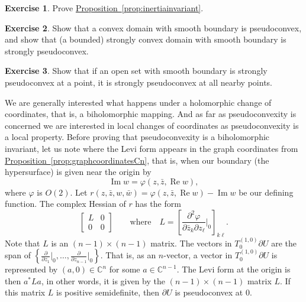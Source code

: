 \documentclass[12pt,openany]{book}
\renewcommand{\Re}{\operatorname{Re}}
\renewcommand{\Im}{\operatorname{Im}}
\newcommand{\C}{{\mathbb{C}}}
\theoremstyle{plain}
\theoremstyle{remark}
\theoremstyle{definition}
\newenvironment{exbox}{%
    \def\FrameCommand{\vrule width 1pt \relax\hspace{10pt}}%
    \MakeFramed{\advance\hsize-\width\FrameRestore}%
}{%
    \endMakeFramed
}
\theoremstyle{exercise}
\newtheorem{exercise}{Exercise}[section]
\theoremstyle{example}
\newcommand{\propref}[1]{\hyperref[#1]{Proposition~\ref*{#1}}}
\begin{document}
\begin{exbox}
\begin{exercise}
Prove \propref{prop:inertiainvariant}.
\end{exercise}

\begin{exercise}
Show that a convex domain with smooth boundary
is pseudoconvex, and show that (a bounded) strongly convex
domain with smooth boundary is strongly pseudoconvex.
\end{exercise}

\begin{exercise}
Show that if an open set with smooth boundary is strongly pseudoconvex at a point, it is strongly
pseudoconvex at all nearby points.
\end{exercise}
\end{exbox}

We are generally interested what happens under a holomorphic change of
coordinates, that is, a biholomorphic mapping.  And as far as pseudoconvexity
is concerned we are interested in local changes of coordinates as
pseudoconvexity is a local property.  Before proving
that pseudoconvexity is a biholomorphic invariant, let us note where the
Levi form appears in the graph coordinates from
\propref{prop:graphcoordinatesCn}, that is, when our boundary (the
hypersurface) is given near the origin by
\begin{equation*}
\Im w = \varphi(z,\bar{z},\Re w) ,
\end{equation*}
where $\varphi$ is $O(2)$.
Let $r(z,\bar{z},w,\bar{w}) = \varphi(z,\bar{z},\Re w) - \Im w$ be our
defining function.  The complex Hessian of $r$ has the form
\begin{equation*}
\begin{bmatrix}
L & 0 \\
0 & 0
\end{bmatrix}
\qquad \text{where} \quad
L = \left[
\frac{\partial^2 \varphi}{\partial \bar{z}_k \partial z_{\ell}}\Big|_0
\right]_{k \ell} .
\end{equation*}
Note that $L$ is an $(n-1) \times (n-1)$ matrix.
The vectors in $T_0^{(1,0)} \partial U$ are the span
of $\left\{
\frac{\partial}{\partial z_1}\big|_0,
\ldots,
\frac{\partial}{\partial z_{n-1}}\big|_0 \right\}$.
That is, as an $n$-vector,
a vector in $T_0^{(1,0)} \partial U$ is represented by $(a,0) \in \C^n$ for
some
$a \in \C^{n-1}$.  The Levi form at the origin is then $a^* L a$,
in other words, it is given by the $(n-1) \times (n-1)$ matrix $L$.
If this matrix $L$ is positive
semidefinite, then $\partial U$ is pseudoconvex at $0$.
\end{document}
